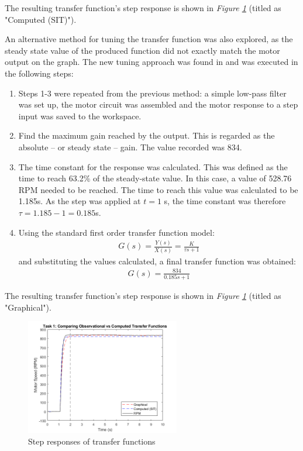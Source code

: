 \documentclass[11pt, onecolumn]{article}
\begin{document}
\par The resulting transfer function's step response is shown in \textit{Figure \ref{fig:q1-graph}} (titled as "Computed (SIT)").
\par An alternative method for tuning the transfer function was also explored, as the steady state value of the produced function did not exactly match the motor output on the graph. The new tuning approach was found in \cite{umichControlTutorials} and was executed in the following steps:
\begin{enumerate}
    \item Steps 1-3 were repeated from the previous method: a simple low-pass filter was set up, the motor circuit was assembled and the motor response to a step input was saved to the workspace.
    \item Find the maximum gain reached by the output. This is regarded as the absolute – or steady state – gain. The value recorded was 834.
    \item The time constant for the response was calculated. This was defined as the time to reach 63.2\% of the steady-state value. In this case, a value of 528.76 RPM needed to be reached. The time to reach this value was calculated to be 1.185s. As the step was applied at $t=1$ s, the time constant was therefore $\tau = 1.185 - 1 = 0.185$s.
    \item Using the standard first order transfer function model:
          \begin{align*}
              G(s)=\frac{Y(s)}{X(s)}=\frac{K}{\tau s + 1}
          \end{align*}
          and substituting the values calculated, a final transfer function was obtained:
          \begin{align*}
              G(s)=\frac{834}{0.185s + 1}
          \end{align*}
\end{enumerate}
\par The resulting transfer function's step response is shown in \textit{Figure \ref{fig:q1-graph}} (titled as "Graphical").
\begin{figure}[h!]
    \centering
    \includegraphics[width=0.6\textwidth]{q1-graphs.png}
    \caption{Step responses of transfer functions }
    \label{fig:q1-graph}
\end{figure}
\end{document}
